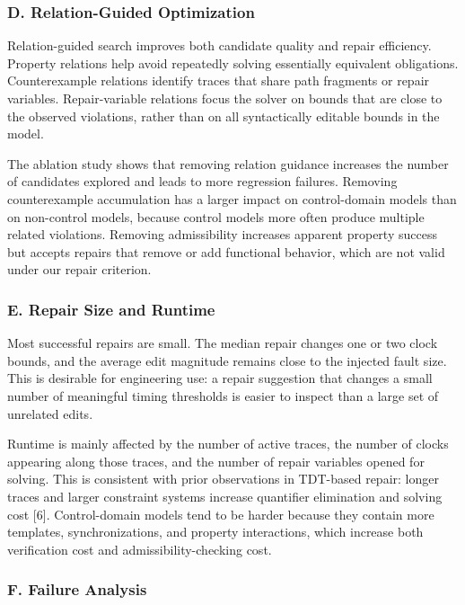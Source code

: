 \documentclass[
]{article}
\begin{document}
\subsubsection{D. Relation-Guided
Optimization}\label{d.-relation-guided-optimization}

Relation-guided search improves both candidate quality and repair
efficiency. Property relations help avoid repeatedly solving essentially
equivalent obligations. Counterexample relations identify traces that
share path fragments or repair variables. Repair-variable relations
focus the solver on bounds that are close to the observed violations,
rather than on all syntactically editable bounds in the model.

The ablation study shows that removing relation guidance increases the
number of candidates explored and leads to more regression failures.
Removing counterexample accumulation has a larger impact on
control-domain models than on non-control models, because control models
more often produce multiple related violations. Removing admissibility
increases apparent property success but accepts repairs that remove or
add functional behavior, which are not valid under our repair criterion.

\subsubsection{E. Repair Size and
Runtime}\label{e.-repair-size-and-runtime}

Most successful repairs are small. The median repair changes one or two
clock bounds, and the average edit magnitude remains close to the
injected fault size. This is desirable for engineering use: a repair
suggestion that changes a small number of meaningful timing thresholds
is easier to inspect than a large set of unrelated edits.

Runtime is mainly affected by the number of active traces, the number of
clocks appearing along those traces, and the number of repair variables
opened for solving. This is consistent with prior observations in
TDT-based repair: longer traces and larger constraint systems increase
quantifier elimination and solving cost {[}6{]}. Control-domain models
tend to be harder because they contain more templates, synchronizations,
and property interactions, which increase both verification cost and
admissibility-checking cost.

\subsubsection{F. Failure Analysis}\label{f.-failure-analysis}
\end{document}
